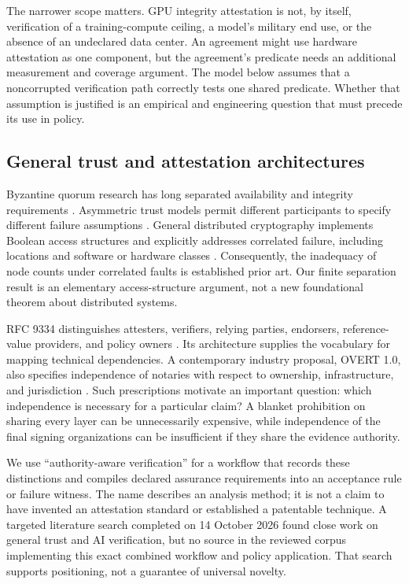 \documentclass[11pt,letterpaper]{article}
\begin{document}
The narrower scope matters. GPU integrity attestation is not, by itself, verification of a training-compute ceiling, a model's military end use, or the absence of an undeclared data center. An agreement might use hardware attestation as one component, but the agreement's predicate needs an additional measurement and coverage argument. The model below assumes that a noncorrupted verification path correctly tests one shared predicate. Whether that assumption is justified is an empirical and engineering question that must precede its use in policy.

\subsection{General trust and attestation architectures}
Byzantine quorum research has long separated availability and integrity requirements \citep{malkhi}. Asymmetric trust models permit different participants to specify different failure assumptions \citep{alpos2024}. General distributed cryptography implements Boolean access structures and explicitly addresses correlated failure, including locations and software or hardware classes \citep{alpos2023}. Consequently, the inadequacy of node counts under correlated faults is established prior art. Our finite separation result is an elementary access-structure argument, not a new foundational theorem about distributed systems.

RFC 9334 distinguishes attesters, verifiers, relying parties, endorsers, reference-value providers, and policy owners \citep{rats}. Its architecture supplies the vocabulary for mapping technical dependencies. A contemporary industry proposal, OVERT 1.0, also specifies independence of notaries with respect to ownership, infrastructure, and jurisdiction \citep{overt}. Such prescriptions motivate an important question: which independence is necessary for a particular claim? A blanket prohibition on sharing every layer can be unnecessarily expensive, while independence of the final signing organizations can be insufficient if they share the evidence authority.

We use ``authority-aware verification'' for a workflow that records these distinctions and compiles declared assurance requirements into an acceptance rule or failure witness. The name describes an analysis method; it is not a claim to have invented an attestation standard or established a patentable technique. A targeted literature search completed on 14 October 2026 found close work on general trust and AI verification, but no source in the reviewed corpus implementing this exact combined workflow and policy application. That search supports positioning, not a guarantee of universal novelty.
\end{document}

